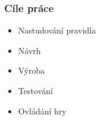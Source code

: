 \documentclass[%
  12pt,       				%
	t,                  %
	aspectratio=1610,   %
	unicode,						%
]{beamer}				    	%
\begin{document}
\disablenavigationsymbols

\maketitle

\begin{frame} 
	\frametitle{Cíle práce}
	\vspace{1cm}
	\begin{itemize}
			\item Nastudování pravidla
			\item Návrh
			\item Výroba
			\item Testování
			\item Ovládání hry
	\end{itemize}
\end{frame}
\end{document}
